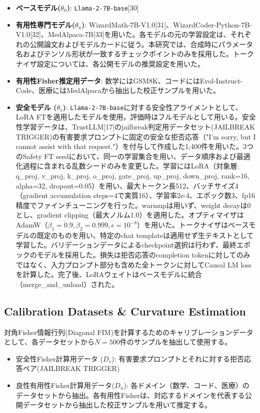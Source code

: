 \documentclass{article}
\begin{document}
\begin{itemize}
\item \textbf{ベースモデル($\theta_0$)}: \texttt{Llama-2-7B-base}[30]
\item \textbf{有用性専門モデル($\theta_u$)}: WizardMath-7B-V1.0[31]、WizardCoder-Python-7B-V1.0[32]、MedAlpaca-7B[33]を用いた。各モデルの元の学習設定は、それぞれの公開論文およびモデルカードに従う。本研究では、合成時にパラメータ名およびテンソル形状が一致するチェックポイントのみを採用した。トークナイザ設定については、各公開モデルの推奨設定を用いた。
\item \textbf{有用性Fisher推定用データ}: 数学にはGSM8K、コードにはEvol-Instruct-Code、医療にはMedAlpacaから抽出した校正サンプルを用いた。
\item \textbf{安全モデル ($\theta_s$)}: \texttt{Llama-2-7B-base}に対する安全性アライメントとして、LoRA FTを適用したモデルを使用，評価時はフルモデルとして用いる。安全性学習データは、TrustLLM[17]のjailbreak判定用データセット(JAILBREAK TRIGGER)の有害要求プロンプトに固定の安全な拒否応答（"I'm sorry, but I cannot assist with that request."）を付与して作成した1,400件を用いた。3つのSafety FT seedにおいて、同一の学習集合を用い、データ順序および最適化過程に含まれる乱数シードのみを変更した。学習にはLoRA（対象層: q\_proj, v\_proj, k\_proj, o\_proj, gate\_proj, up\_proj, down\_proj, rank=16, alpha=32, dropout=0.05）を用い、最大トークン長512、バッチサイズ4（gradient accumulation steps=4で実質16）、学習率2e-4、エポック数3、fp16精度でファインチューニングを行った。warmupは用いず、weight decayは0とし、gradient clipping（最大ノルム1.0）を適用した。オプティマイザはAdamW（\(\beta_1=0.9, \beta_2=0.999, \epsilon=10^{-8}\)）を用いた。トークナイザはベースモデルの既定のものを用い、特定のchat templateは適用せず生テキストとして学習した。バリデーションデータによるcheckpoint選択は行わず、最終エポックのモデルを採用した。損失は拒否応答のcompletion tokenに対してのみではなく、入力プロンプト部分も含めた全トークンに対してCausal LM lossを計算した。完了後、LoRAウェイトはベースモデルに統合（merge\_and\_unload）された。
\end{itemize}

\subsection{Calibration Datasets \& Curvature Estimation}
\label{app:calibration_datasets}
対角Fisher情報行列(Diagonal FIM)を計算するためのキャリブレーションデータとして、各データセットから$N=500$件のサンプルを抽出して使用する。
\begin{itemize}
\item 安全性Fisher計算用データ ($D_s$): 有害要求プロンプトとそれに対する拒否応答ペア(JAILBREAK TRIGGER)
\item 良性有用性Fisher計算用データ($D_u$): 各ドメイン（数学、コード、医療）のデータセットから抽出。各有用性Fisherは、対応するドメインを代表する公開データセットから抽出した校正サンプルを用いて推定する。
\end{itemize}
\end{document}
